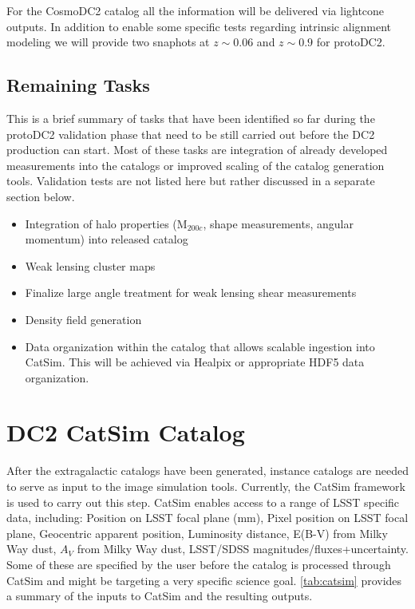 \documentclass[preprint,times]{aastex61}
\begin{document}
For the CosmoDC2 catalog all the information will be delivered via lightcone outputs. In addition to enable some specific tests regarding intrinsic alignment modeling we will provide two snaphots at $z\sim 0.06$ and $z\sim 0.9$ for protoDC2.

\subsection{Remaining Tasks}

This is a brief summary of tasks that have been identified so far during the protoDC2 validation phase that need to be still carried out before the DC2 production can start. Most of these tasks are integration of already developed measurements into the catalogs or improved scaling of the catalog generation tools. Validation tests are not listed here but rather discussed in a separate section below.

\begin{itemize}
\item Integration of halo properties (M$_{200c}$, shape measurements, angular momentum) into released catalog
\item Weak lensing cluster maps
\item Finalize large angle treatment for weak lensing shear measurements
\item Density field generation
\item Data organization within the catalog that allows scalable ingestion into CatSim. This will be achieved via Healpix or appropriate HDF5 data organization. 
\end{itemize}

\section{DC2 CatSim Catalog}

After the extragalactic catalogs have been generated, instance catalogs are needed to serve as input to the image simulation tools. Currently, the CatSim framework is used to carry out this step. CatSim enables access to a range of LSST specific data, including: Position on LSST focal plane (mm), Pixel position on LSST focal plane, Geocentric apparent position,            
Luminosity distance, E(B-V) from Milky Way dust, $A_V$ from Milky Way dust, LSST/SDSS magnitudes/fluxes+uncertainty. Some of these are specified by the user before the catalog is processed through CatSim and might be targeting a very specific science goal. \autoref{tab:catsim} provides a summary of the inputs to CatSim and the resulting outputs.
\end{document}
